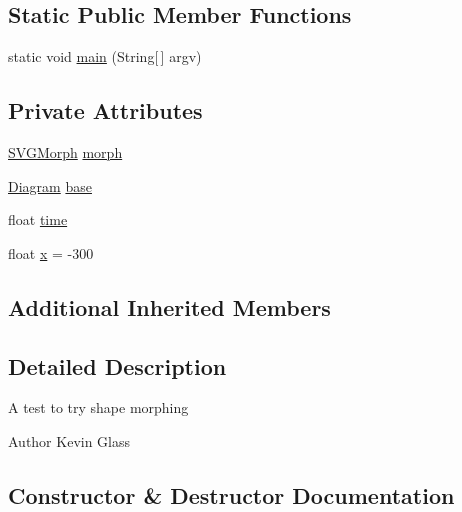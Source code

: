 \subsection*{Static Public Member Functions}
\begin{DoxyCompactItemize}
\item 
static void \mbox{\hyperlink{classorg_1_1newdawn_1_1slick_1_1tests_1_1_morph_s_v_g_test_a498203e37a3e5da2c98ae929f78ac99d}{main}} (String\mbox{[}$\,$\mbox{]} argv)
\end{DoxyCompactItemize}
\subsection*{Private Attributes}
\begin{DoxyCompactItemize}
\item 
\mbox{\hyperlink{classorg_1_1newdawn_1_1slick_1_1svg_1_1_s_v_g_morph}{S\+V\+G\+Morph}} \mbox{\hyperlink{classorg_1_1newdawn_1_1slick_1_1tests_1_1_morph_s_v_g_test_a2690459557274439020ce1df8ecd40e6}{morph}}
\item 
\mbox{\hyperlink{classorg_1_1newdawn_1_1slick_1_1svg_1_1_diagram}{Diagram}} \mbox{\hyperlink{classorg_1_1newdawn_1_1slick_1_1tests_1_1_morph_s_v_g_test_a48bdfb5f5bb3f489b24b8b13df4ff87e}{base}}
\item 
float \mbox{\hyperlink{classorg_1_1newdawn_1_1slick_1_1tests_1_1_morph_s_v_g_test_a69e55a6c0d84946235d4ff784368d144}{time}}
\item 
float \mbox{\hyperlink{classorg_1_1newdawn_1_1slick_1_1tests_1_1_morph_s_v_g_test_a057720812f0ba829cbcdde70d9a037cf}{x}} = -\/300
\end{DoxyCompactItemize}
\subsection*{Additional Inherited Members}


\subsection{Detailed Description}
A test to try shape morphing

\begin{DoxyAuthor}{Author}
Kevin Glass 
\end{DoxyAuthor}


\subsection{Constructor \& Destructor Documentation}
\mbox{\label{classorg_1_1newdawn_1_1slick_1_1tests_1_1_morph_s_v_g_test_a81c7ae3211150308d5a3f51b5870eb89}} 
